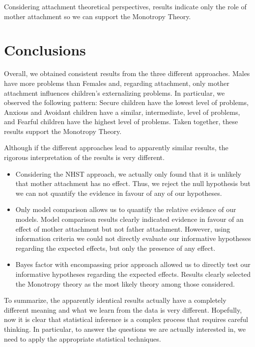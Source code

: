 \documentclass[
]{book}
\providecommand{\tightlist}{%
  \setlength{\itemsep}{0pt}\setlength{\parskip}{0pt}}
\begin{document}
Considering attachment theoretical perspectives, results indicate only the role of mother attachment so we can support the Monotropy Theory.

\hypertarget{conclusion-ext}{%
\chapter{Conclusions}\label{conclusion-ext}}

Overall, we obtained consistent results from the three different approaches. Males have more problems than Females and, regarding attachment, only mother attachment influences children's externalizing problems. In particular, we observed the following pattern: Secure children have the lowest level of problems, Anxious and Avoidant children have a similar, intermediate, level of problems, and Fearful children have the highest level of problems. Taken together, these results support the Monotropy Theory.

Although if the different approaches lead to apparently similar results, the rigorous interpretation of the results is very different.

\begin{itemize}
\tightlist
\item
  Considering the NHST approach, we actually only found that it is unlikely that mother attachment has no effect. Thus, we reject the null hypothesis but we can not quantify the evidence in favour of any of our hypotheses.
\item
  Only model comparison allows us to quantify the relative evidence of our models. Model comparison results clearly indicated evidence in favour of an effect of mother attachment but not father attachment. However, using information criteria we could not directly evaluate our informative hypotheses regarding the expected effects, but only the presence of any effect.
\item
  Bayes factor with encompassing prior approach allowed us to directly test our informative hypotheses regarding the expected effects. Results clearly selected the Monotropy theory as the most likely theory among those considered.
\end{itemize}

To summarize, the apparently identical results actually have a completely different meaning and what we learn from the data is very different. Hopefully, now it is clear that statistical inference is a complex process that requires careful thinking. In particular, to answer the questions we are actually interested in, we need to apply the appropriate statistical techniques.
\end{document}
